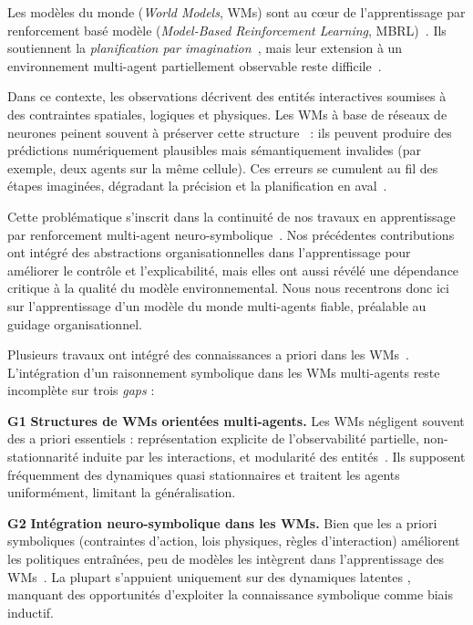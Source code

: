 \documentclass[final]{jfsma}
\theoremstyle{plain}
\theoremstyle{definition}
\theoremstyle{remark}
\begin{document}
Les modèles du monde (\emph{World Models}, WMs) sont au cœur de l'apprentissage par renforcement basé modèle (\emph{Model-Based Reinforcement Learning}, MBRL)~\cite{ha2018worldmodels,hafner2019learning,hafner2020dreamer,hafner2021dreamerv2}. Ils soutiennent la \emph{planification par imagination}~\cite{hafner2019learning}, mais leur extension à un environnement multi-agent partiellement observable reste difficile~\cite{Wong2023,Venugopal2024MABL,agravante-etal-2023-learning}.

Dans ce contexte, les observations décrivent des entités interactives soumises à des contraintes spatiales, logiques et physiques. Les WMs à base de réseaux de neurones peinent souvent à préserver cette structure~\cite{kipf2020contrastivelearningstructuredworld} : ils peuvent produire des prédictions numériquement plausibles mais sémantiquement invalides (par exemple, deux agents sur la même cellule). Ces erreurs se cumulent au fil des étapes imaginées, dégradant la précision et la planification en aval~\cite{talvitie2014modelbias}.

Cette problématique s'inscrit dans la continuité de nos travaux en apprentissage par renforcement multi-agent neuro-symbolique~\cite{soule2025moisemarl}. Nos précédentes contributions ont intégré des abstractions organisationnelles dans l'apprentissage pour améliorer le contrôle et l'explicabilité, mais elles ont aussi révélé une dépendance critique à la qualité du modèle environnemental. Nous nous recentrons donc ici sur l'apprentissage d'un modèle du monde multi-agents fiable, préalable au guidage organisationnel.

Plusieurs travaux ont intégré des connaissances a priori dans les WMs~\cite{kipf2020contrastivelearningstructuredworld,balloch2023neurosymbolicworldmodelsadapting,agravante-etal-2023-learning}. L'intégration d'un raisonnement symbolique dans les WMs multi-agents reste incomplète sur trois \emph{gaps} :

\textbf{G1} \textbf{Structures de WMs orientées multi-agents.}
Les WMs négligent souvent des a priori essentiels : représentation explicite de l'observabilité partielle, non-stationnarité induite par les interactions, et modularité des entités~\cite{zhang2021worldmodelgraph, Willemsen2021MAMBPO, Venugopal2024MABL}. Ils supposent fréquemment des dynamiques quasi stationnaires et traitent les agents uniformément, limitant la généralisation.

\textbf{G2} \textbf{Intégration neuro-symbolique dans les WMs.}
Bien que les a priori symboliques (contraintes d'action, lois physiques, règles d'interaction) améliorent les politiques entraînées, peu de modèles les intègrent dans l'apprentissage des WMs~\cite{Xu2018semanticloss, Fan2017differentiablelearninglogicalrules, balloch2023neurosymbolicworldmodelsadapting, garcez2023neurosymbolic}. La plupart s'appuient uniquement sur des dynamiques latentes , manquant des opportunités d'exploiter la connaissance symbolique comme biais inductif.
\end{document}
